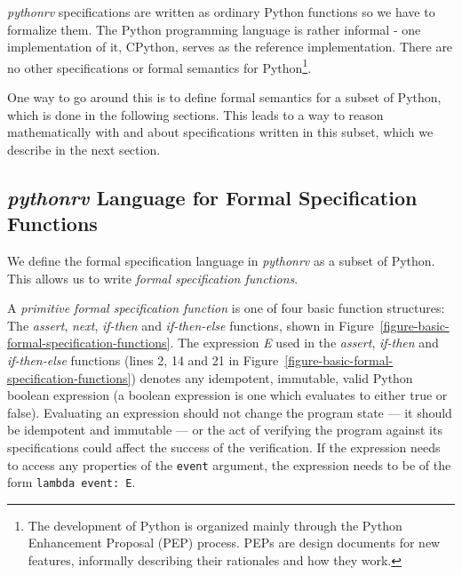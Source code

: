 \textit{pythonrv} specifications are written as ordinary Python functions so we
have to formalize them.  The Python programming language is rather informal -
one implementation of it, CPython, serves as the reference implementation.
There are no other specifications or formal semantics for Python\footnote{The
development of Python is organized mainly through the Python Enhancement
Proposal (PEP) process. PEPs are design documents for new features,
informally describing their rationales and how they work.}.

One way to go around this is to define formal semantics for a subset of Python,
which is done in the following sections. This leads to a way to reason
mathematically with and about specifications written in this subset, which we
describe in the next section.





\subsection{\textit{pythonrv} Language for Formal Specification Functions}
\label{section-approach-python-subset}
\lstset{language=Python,numbers=left}

We define the formal specification language in \textit{pythonrv} as a subset of
Python. This allows us to write \textit{formal specification functions}.

\begin{mydef}
\label{def-primitive-formal-specification-function}
A \textit{primitive formal specification function} is one of four basic
function structures: The \textit{assert}, \textit{next}, \textit{if-then} and
\textit{if-then-else} functions, shown in
Figure~\ref{figure-basic-formal-specification-functions}. The expression
\textit{E} used in the \textit{assert}, \textit{if-then} and
\textit{if-then-else} functions (lines 2, 14 and 21 in
Figure~\ref{figure-basic-formal-specification-functions}) denotes any
idempotent, immutable, valid Python boolean expression (a boolean expression is
one which evaluates to either true or false). Evaluating an expression should
not change the program state --- it should be idempotent and immutable --- or
the act of verifying the program against its specifications could affect the
success of the verification. If the expression needs to access any properties
of the \texttt{event} argument, the expression needs to be of the form
\texttt{lambda event: E}.
\end{mydef}

